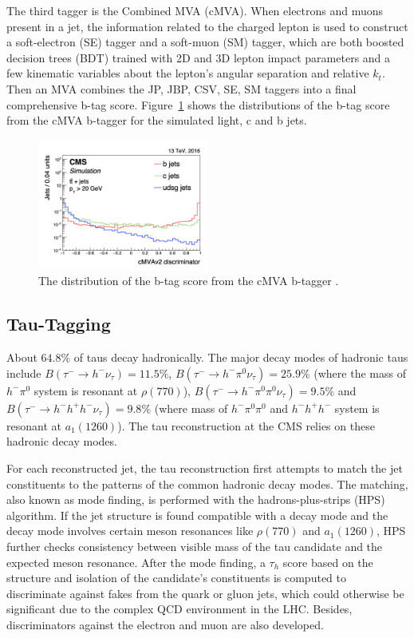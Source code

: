 The third tagger is the Combined MVA (cMVA). When electrons and muons present in a jet, the information related to the charged lepton is used to construct a soft-electron (SE) tagger and a soft-muon (SM) tagger, which are both boosted decision trees (BDT) trained with 2D and 3D lepton impact parameters and a few kinematic variables about the lepton's angular separation and relative $k_t$. Then an MVA combines the JP, JBP, CSV, SE, SM taggers into a final comprehensive b-tag score. Figure~\ref{fig:cmsexperiment:reconstruction:cMVA} shows the distributions of the b-tag score from the cMVA b-tagger for the simulated light, c and b jets.

\begin{figure}[ht]
    \centering
    \includegraphics[width=0.5\textwidth]{chapters/CMSExperiment/sectionReconstruction/figures/cMVA}
    \caption{The distribution of the b-tag score from the cMVA b-tagger \cite{Sirunyan:2017ezt}. }
    \label{fig:cmsexperiment:reconstruction:cMVA}
\end{figure}





\subsection{Tau-Tagging}

About $64.8\%$ of taus decay hadronically. The major decay modes of hadronic taus include $B(\tau^- \to h^- \nu_\tau)=11.5\% $, $B(\tau^- \to h^- \pi^0 \nu_\tau)=25.9\% $ (where the mass of $h^-\pi^0$ system is resonant at $\rho(770)$), $B(\tau^- \to h^- \pi^0 \pi^0 \nu_\tau)=9.5\% $ and $B(\tau^- \to h^- h^+ h^- \nu_\tau)=9.8\% $ (where mass of $h^- \pi^0 \pi^0$ and $h^- h^+ h^- $ system is resonant at $a_1(1260)$). The tau reconstruction at the CMS relies on these hadronic decay modes.

For each reconstructed jet, the tau reconstruction first attempts to match the jet constituents to the patterns of the common hadronic decay modes. The matching, also known as mode finding, is performed with the hadrons-plus-strips (HPS) algorithm. If the jet structure is found compatible with a decay mode and the decay mode involves certain meson resonances like $\rho(770)$ and $a_1(1260)$, HPS further checks consistency between visible mass of the tau candidate and the expected meson resonance. After the mode finding, a $\tau_h$ score based on the structure and isolation of the candidate's constituents is computed to discriminate against fakes from the quark or gluon jets, which could otherwise be significant due to the complex QCD environment in the LHC. Besides, discriminators against the electron and muon are also developed.


